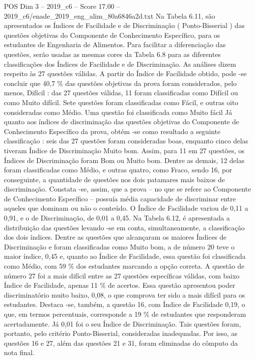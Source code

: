 \begin{textsample}{POS Dim 3 – 2019\_c6 – Score 17.00 – 2019\_c6/enade\_2019\_eng\_alim\_80a6846a2d.txt}
Na Tabela 6.11, são apresentados os Índices de Facilidade e de Discriminação ( Ponto-Bisserial ) das questões objetivas do Componente de Conhecimento Específico, para os estudantes de Engenharia de Alimentos.
Para facilitar a diferenciação das questões, serão usadas as mesmas cores da Tabela 6.8 para as diferentes classificações dos Índices de Facilidade e de Discriminação.
As análises dizem respeito às 27 questões válidas.
A partir do Índice de Facilidade obtido, pode -se concluir que 40,7 \% das questões objetivas da prova foram considerados, pelo menos, Difícil : das 27 questões válidas, 11 foram classificadas como Difícil ou como Muito difícil.
Sete questões foram classificadas como Fácil, e outras oito consideradas como Médio.
Uma questão foi classificada como Muito fácil Já quanto aos índices de discriminação das questões objetivas do Componente de Conhecimento Específico da prova, obtém -se como resultado a seguinte classificação : seis das 27 questões foram consideradas boas, enquanto cinco delas tiveram Índice de Discriminação Muito bom.
Assim, para 11 em 27 questões, os Índices de Discriminação foram Bom ou Muito bom.
Dentre as demais, 12 delas foram classificadas como Médio, e outras quatro, como Fraco, sendo 16, por conseguinte, a quantidade de questões nos dois patamares mais baixos de discriminação.
Constata -se, assim, que a prova – no que se refere ao Componente de Conhecimento Específico – possuía média capacidade de discriminar entre aqueles que dominam ou não o conteúdo.
O Índice de Facilidade variou de 0,11 a 0,91, e o de Discriminação, de 0,01 a 0,45.
Na Tabela 6.12, é apresentada a distribuição das questões levando -se em conta, simultaneamente, a classificação dos dois índices.
Dentre as questões que alcançaram os maiores Índices de Discriminação e foram classificadas como Muito bom, a de número 20 teve o maior índice, 0,45 e, quanto ao Índice de Facilidade, essa questão foi classificada como Médio, com 59 \% dos estudantes marcando a opção correta.
A questão de número 27 foi a mais difícil entre as 27 questões específicas válidas, com baixo Índice de Facilidade, apenas 11 \% de acertos.
Essa questão apresentou poder discriminatório muito baixo, 0,08, o que comprova ter sido a mais difícil para os estudantes.
Destaca -se, também, a questão 16, com Índice de Facilidade 0,19, o que, em termos percentuais, corresponde a 19 \% de estudantes que responderam acertadamente.
Já 0,01 foi o seu Índice de Discriminação.
Tais questões foram, portanto, pelo critério Ponto-Bisserial, consideradas inadequadas.
Por isso, as questões 16 e 27, além das questões 21 e 31, foram eliminadas do cômputo da nota final.

\end{textsample}
